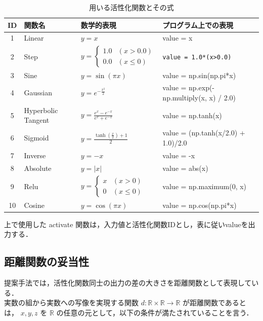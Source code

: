 \begin{table}[H]
    \caption{用いる活性化関数とその式}
    \centering
    \begin{tabular}{clll}
        \hline
        ID & 関数名 & 数学的表現 & プログラム上での表現 \\
        \hline \hline
        1 & Linear & $ y = x $ & value = x \\
        2 & Step & $ y = \begin{cases}
            1.0 & (x > 0.0) \\
            0.0 & (x \leq 0)
            \end{cases} $ & \texttt{value = 1.0*(x>0.0)} \\
        3 & Sine & $ y = \sin(\pi x) $ & value = np.sin(np.pi*x) \\
        4 & Gaussian & $ y = e^{-\frac{x^2}{2}} $ & value = np.exp(-np.multiply(x, x) / 2.0) \\
        5 & Hyperbolic Tangent & $ y = \frac{e^{x} - e^{-x}}{e^{x} + e^{-x}} $ & value = np.tanh(x) \\
        6 & Sigmoid & $ y = \frac{\tanh\left(\frac{x}{2}\right) + 1}{2} $ & value = (np.tanh(x/2.0) + 1.0)/2.0 \\
        7 & Inverse & $ y = -x $ & value = -x \\
        8 &Absolute & $ y = |x| $ & value = abs(x) \\
        9 & Relu & $ y = 
        \begin{cases}
        x & (x > 0)\\
        0 & (x \leq 0)
        \end{cases} $ & value = np.maximum(0, x) \\
        10 & Cosine & $ y = \cos(\pi x) $ & value = np.cos(np.pi*x) \\
        \hline
    \end{tabular}
\end{table}

上で使用した activate 関数は，入力値と活性化関数IDとし，表に従いvalueを出力する．

\subsection{距離関数の妥当性}
提案手法では，活性化関数同士の出力の差の大きさを距離関数として表現している． \\
実数の組から実数への写像を実現する関数 $ d: \mathbb{R} \times \mathbb{R} \rightarrow \mathbb{R} $ が距離関数であるとは， $ x, y, z $ を $ \mathbb{R} $ の任意の元として，以下の条件が満たされていることを言う\cite{距離関数}．

